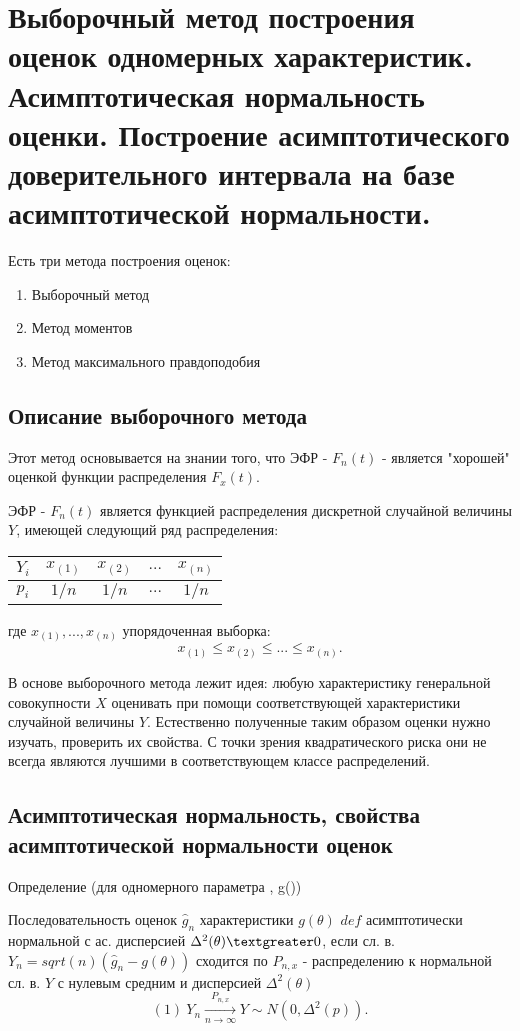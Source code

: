 \section{Выборочный метод построения оценок одномерных характеристик. Асимптотическая нормальность оценки. Построение асимптотического доверительного интервала на базе асимптотической нормальности.}

Есть три метода построения оценок: \\

\begin{enumerate}
  \item Выборочный метод
  \item Метод моментов
  \item Метод максимального правдоподобия
\end{enumerate}


\subsection{Описание выборочного метода}

Этот метод основывается на знании того, что ЭФР - $F_n(t)$ - является "хорошей" оценкой функции распределения $F_x(t)$.

ЭФР - $F_n(t)$ является функцией распределения дискретной случайной величины $Y$, имеющей следующий ряд распределения:


\begin{center}
\begin{tabular}{ c|c|c|c|c }
  $Y_i$ & $x_{(1)}$ & $x_{(2)}$ & $...$ & $x_{(n)}$ \\
 \hline
 $p_i$ & $1/n$ & $1/n$ & $...$ & $1/n$ \\
\end{tabular}
\end{center}

где $x_{(1)}, ..., x_{(n)}$ упорядоченная выборка:
\[
  x_{(1)} \le x_{(2)} \le ... \le x_{(n)}
.\]

В основе выборочного метода лежит идея:
любую характеристику генеральной совокупности $X$ оценивать при помощи соответствующей характеристики случайной величины $Y$. Естественно полученные таким образом оценки нужно изучать, проверить их свойства. С точки зрения квадратического риска они не всегда являются лучшими в соответствующем классе распределений.

\subsection{Асимптотическая нормальность, свойства асимптотической нормальности оценок}

Определение (для одномерного параметра \theta, g(\theta))

Последовательность оценок $\hat{g}_n$ характеристики $g(\theta)$ $def$ асимптотически нормальной с ас. дисперсией $\Delta^2(\theta) \textgreater 0$, если сл. в. $Y_n = sqrt(n)(\hat{g}_n - g(\theta))$ сходится по $P_{n, x}$ - распределению к нормальной сл. в. $Y$ с нулевым средним и дисперсией $\Delta^2(\theta)$
\[
  (1)~ Y_n \xrightarrow[n \to \infty]{P_{n, x}} Y \sim N(0, \Delta^2(p))
.\]
